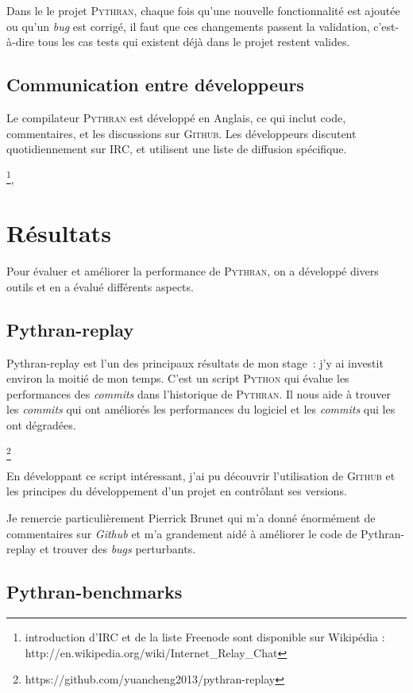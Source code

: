 \documentclass[a4paper, 11pt]{article}
\newcommand\Pythran{\textsc{Pythran}}
\newcommand\Python{\textsc{Python}}
\newcommand\Github{\textsc{Github}}
\begin{document}
Dans le le projet \Pythran{}, chaque fois  qu'une nouvelle fonctionnalité est ajoutée ou
qu'un \emph{bug} est corrigé, il faut que ces changements passent la validation,
c'est-à-dire tous les cas tests qui existent déjà dans le projet restent valides.


\subsection*{Communication entre développeurs}

Le compilateur \Pythran{} est développé en Anglais, ce qui inclut code,
commentaires, et les discussions sur \Github{}.
Les développeurs discutent quotidiennement sur IRC, et utilisent une liste de diffusion spécifique.

\footnote{introduction d'IRC et de la liste Freenode sont disponible
sur Wikipédia : http://en.wikipedia.org/wiki/Internet\_Relay\_Chat},
\section{Résultats}
\label{sec:resultats}

Pour évaluer et améliorer la performance de \Pythran{}, on a développé
divers outils et en a évalué différents aspects.

\subsection*{Pythran-replay}

Pythran-replay est l'un des principaux résultats de mon stage~: j'y ai investit environ la moitié de mon temps. C'est un script
\Python{} qui évalue les performances des \emph{commits} dans l'historique de \Pythran{}.
Il nous aide à trouver les \emph{commits} qui ont améliorés les
performances du logiciel et les \emph{commits} qui les ont dégradées.

\footnote{https://github.com/yuancheng2013/pythran-replay}

En développant ce script intéressant, j'ai pu découvrir l'utilisation de
\Github{} et les principes du développement d'un projet en contrôlant ses versions.

Je remercie particulièrement Pierrick Brunet qui m'a donné énormément de
commentaires sur \emph{Github} et m'a grandement aidé à améliorer le code de Pythran-replay et
trouver des \emph{bugs} perturbants.

\subsection*{Pythran-benchmarks}
\end{document}
